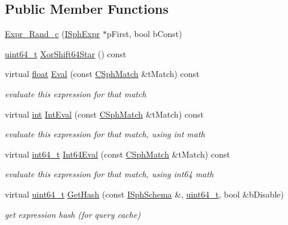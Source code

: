 \subsection*{Public Member Functions}
\begin{DoxyCompactItemize}
\item 
\hyperlink{structExpr__Rand__c_ab97ff187b401825d9bedf755f6b41913}{Expr\-\_\-\-Rand\-\_\-c} (\hyperlink{structISphExpr}{I\-Sph\-Expr} $\ast$p\-First, bool b\-Const)
\item 
\hyperlink{sphinxstd_8h_aaa5d1cd013383c889537491c3cfd9aad}{uint64\-\_\-t} \hyperlink{structExpr__Rand__c_a46522540723bbd760a302973ed176716}{Xor\-Shift64\-Star} () const 
\item 
virtual \hyperlink{sphinxexpr_8cpp_a0e0d0739f7035f18f949c2db2c6759ec}{float} \hyperlink{structExpr__Rand__c_a449f114c10ae5a3b8050e312c355c65a}{Eval} (const \hyperlink{classCSphMatch}{C\-Sph\-Match} \&t\-Match) const 
\begin{DoxyCompactList}\small\item\em evaluate this expression for that match \end{DoxyCompactList}\item 
virtual \hyperlink{sphinxexpr_8cpp_a4a26e8f9cb8b736e0c4cbf4d16de985e}{int} \hyperlink{structExpr__Rand__c_a6b5881ca08ad2a01f188d8ca88bba1ce}{Int\-Eval} (const \hyperlink{classCSphMatch}{C\-Sph\-Match} \&t\-Match) const 
\begin{DoxyCompactList}\small\item\em evaluate this expression for that match, using int math \end{DoxyCompactList}\item 
virtual \hyperlink{sphinxstd_8h_a996e72f71b11a5bb8b3b7b6936b1516d}{int64\-\_\-t} \hyperlink{structExpr__Rand__c_a9c79ff51fd2827f4c45b49886dc24bd7}{Int64\-Eval} (const \hyperlink{classCSphMatch}{C\-Sph\-Match} \&t\-Match) const 
\begin{DoxyCompactList}\small\item\em evaluate this expression for that match, using int64 math \end{DoxyCompactList}\item 
virtual \hyperlink{sphinxstd_8h_aaa5d1cd013383c889537491c3cfd9aad}{uint64\-\_\-t} \hyperlink{structExpr__Rand__c_a2f4a8284f57251fcbc3a70cdbf967276}{Get\-Hash} (const \hyperlink{classISphSchema}{I\-Sph\-Schema} \&, \hyperlink{sphinxstd_8h_aaa5d1cd013383c889537491c3cfd9aad}{uint64\-\_\-t}, bool \&b\-Disable)
\begin{DoxyCompactList}\small\item\em get expression hash (for query cache) \end{DoxyCompactList}\end{DoxyCompactItemize}
